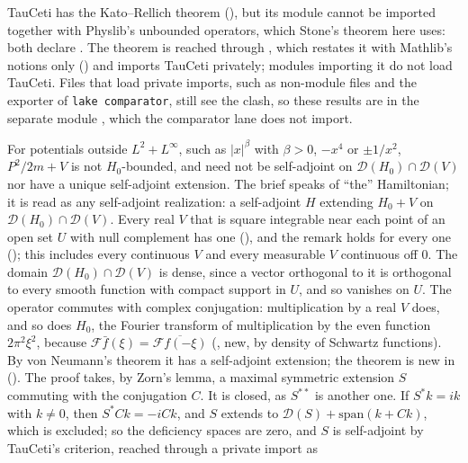 \documentclass[11pt]{article}
\begin{document}
\begin{itemize}
  TauCeti has the Kato--Rellich theorem (), but
  its module cannot be imported together with Physlib's unbounded operators, which Stone's
  theorem here uses: both declare . The theorem is reached through
  , which restates it with
  Mathlib's notions only () and imports TauCeti
  privately; modules importing it do not load TauCeti. Files that load private imports, such as
  non-module files and the exporter of \texttt{lake comparator}, still see the clash, so these
  results are in the separate module , which the
  comparator lane does not import.

  For potentials outside $L^2 + L^\infty$, such as $|x|^\beta$ with $\beta > 0$, $-x^4$ or
  $\pm 1/x^2$, $P^2/2m + V$ is not $H_0$-bounded, and need not be self-adjoint on
  $\mathcal{D}(H_0) \cap \mathcal{D}(V)$ nor have a unique self-adjoint extension. The brief
  speaks of ``the'' Hamiltonian; it is read as any self-adjoint realization: a self-adjoint $H$
  extending $H_0 + V$ on $\mathcal{D}(H_0) \cap \mathcal{D}(V)$. Every real $V$ that is
  square integrable near each point of an open set $U$ with null complement has one
  (), and the remark holds for every one
  (); this includes every continuous $V$ and
  every measurable $V$ continuous off $0$. The domain $\mathcal{D}(H_0) \cap \mathcal{D}(V)$
  is dense, since a vector orthogonal to it is orthogonal to every smooth function with compact
  support in $U$, and so vanishes on $U$. The operator commutes with complex conjugation:
  multiplication by a real $V$ does, and so does $H_0$, the Fourier transform of
  multiplication by the even function $2\pi^2\xi^2$, because
  $\mathcal{F}\bar f(\xi) = \overline{\mathcal{F}f(-\xi)}$ (, new,
  by density of Schwartz functions). By von Neumann's theorem it has a self-adjoint
  extension; the theorem is new in 
  (). The proof takes, by Zorn's
  lemma, a maximal symmetric extension $S$ commuting with the conjugation $C$. It is closed, as
  $S^{**}$ is another one. If $S^*k = ik$ with $k \ne 0$, then $S^*Ck = -iCk$, and $S$ extends
  to $\mathcal{D}(S) + \mathrm{span}(k + Ck)$, which is excluded; so the deficiency spaces are
  zero, and $S$ is self-adjoint by TauCeti's criterion, reached through a private import as

\end{itemize}
\end{document}
